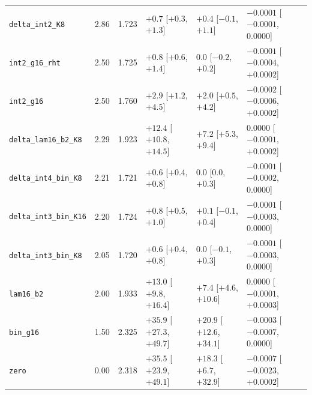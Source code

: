 \begin{table}[t]
\begin{tabular}{lrrlll}
\texttt{delta\_int2\_K8} & 2.86 & 1.723 & $+0.7$ [$+0.3$, $+1.3$] & $+0.4$ [$-0.1$, $+1.1$] & $-0.0001$ [$-0.0001$, 0.0000] \\
\texttt{int2\_g16\_rht} & 2.50 & 1.725 & $+0.8$ [$+0.6$, $+1.4$] & 0.0 [$-0.2$, $+0.2$] & $-0.0001$ [$-0.0004$, $+0.0002$] \\
\texttt{int2\_g16} & 2.50 & 1.760 & $+2.9$ [$+1.2$, $+4.5$] & $+2.0$ [$+0.5$, $+4.2$] & $-0.0002$ [$-0.0006$, $+0.0002$] \\
\texttt{delta\_lam16\_b2\_K8} & 2.29 & 1.923 & $+12.4$ [$+10.8$, $+14.5$] & $+7.2$ [$+5.3$, $+9.4$] & 0.0000 [$-0.0001$, $+0.0002$] \\
\texttt{delta\_int4\_bin\_K8} & 2.21 & 1.721 & $+0.6$ [$+0.4$, $+0.8$] & 0.0 [0.0, $+0.3$] & $-0.0001$ [$-0.0002$, 0.0000] \\
\texttt{delta\_int3\_bin\_K16} & 2.20 & 1.724 & $+0.8$ [$+0.5$, $+1.0$] & $+0.1$ [$-0.1$, $+0.4$] & $-0.0001$ [$-0.0003$, 0.0000] \\
\texttt{delta\_int3\_bin\_K8} & 2.05 & 1.720 & $+0.6$ [$+0.4$, $+0.8$] & 0.0 [$-0.1$, $+0.3$] & $-0.0001$ [$-0.0003$, 0.0000] \\
\texttt{lam16\_b2} & 2.00 & 1.933 & $+13.0$ [$+9.8$, $+16.4$] & $+7.4$ [$+4.6$, $+10.6$] & 0.0000 [$-0.0001$, $+0.0003$] \\
\texttt{bin\_g16} & 1.50 & 2.325 & $+35.9$ [$+27.3$, $+49.7$] & $+20.9$ [$+12.6$, $+34.1$] & $-0.0003$ [$-0.0007$, 0.0000] \\
\texttt{zero} & 0.00 & 2.318 & $+35.5$ [$+23.9$, $+49.1$] & $+18.3$ [$+6.7$, $+32.9$] & $-0.0007$ [$-0.0023$, $+0.0002$] \\
\bottomrule
\end{tabular}
\end{table}
